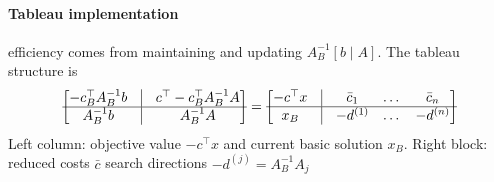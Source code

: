 \documentclass{article}
\begin{document}
\paragraph{Tableau implementation} efficiency comes from maintaining and updating $A_B^{-1}[b \mid A]$. The tableau structure is
\begin{align*}
    \begin{bmatrix}
        -c_B^\top A_B^{-1}b & \vline& c^\top  - c_B^\top A_B^{-1}A\\
        \hline
        A_B^{-1}b & \vline & A_B^{-1}A
    \end{bmatrix} = \begin{bmatrix}
        -c^\top x & \vline& \bar c_1 & \dots & \bar c_n\\
        \hline
        x_B & \vline & -d^{(1)} & \dots & -d^{(n)}\\
    \end{bmatrix}
\end{align*}
Left column: objective value $-c^\top x$ and current basic solution $x_B$. Right block: reduced costs $\bar c$ search directions $-d^{(j)} = A_B^{-1}A_j$
\end{document}
